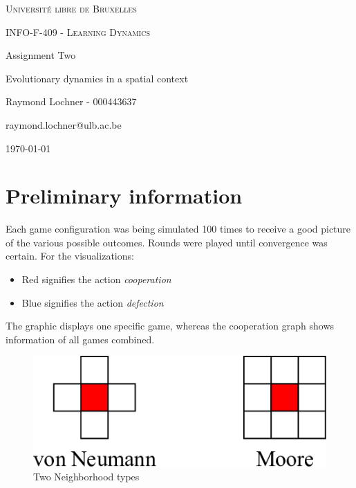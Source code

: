 \documentclass[a4paper, 11pt]{article}
\date{\today}
\begin{document}
\begin{titlepage}
	\centering
	{\scshape\LARGE Université libre de Bruxelles \par}
	\vspace{1cm}
	{\scshape\Large INFO-F-409 - Learning Dynamics\par}
	\vspace{1.5cm}
	{\huge\bfseries {Assignment Two\par}}
	\vspace{0.5cm}
	{\Large Evolutionary dynamics in a spatial context\par}
	\vspace{2cm}
	{\Large Raymond Lochner - 000443637\par}
	\vspace{0.5cm}
	{\Large raymond.lochner@ulb.ac.be}
	\vfill
	
	\setcounter{tocdepth}{2} %
	\tableofcontents

\vfill
	{\large \today \par}
\end{titlepage}

\newpage

\section*{Preliminary information}

Each game configuration was being simulated 100 times to receive a good picture of the various possible outcomes. Rounds were played until convergence was certain. For the visualizations:
\begin{itemize}[noitemsep]
  \item Red signifies the action \textit{cooperation}
  \item Blue signifies the action \textit{defection}
\end{itemize}

The graphic displays one specific game, whereas the cooperation graph shows information of all games combined.


\begin{figure}[H]
	\centering
    \includegraphics[width=0.9\linewidth]{NeighborhoodType}
    \caption{Two Neighborhood types}
\end{figure}
\end{document}

